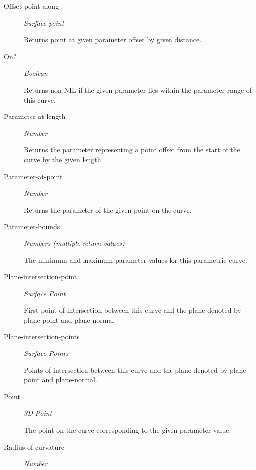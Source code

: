 \documentclass [11pt]{book}
\begin{document}
\begin{itemize}
\begin{description}
\item [Offset-point-along]
\emph{Surface point}

 Returns point at given parameter offset by given distance.




\item [On?]
\emph{Boolean}

 Returns non-NIL if the given parameter lies within the parameter range of this curve.




\item [Parameter-at-length]
\emph{Number}

 Returns the parameter representing a point offset from the start of the curve by the given length.




\item [Parameter-at-point]
\emph{Number}

 Returns the parameter of the given point on the curve.




\item [Parameter-bounds]
\emph{Numbers (multiple return values)}

 The minimum and maximum parameter values for this parametric curve.




\item [Plane-intersection-point]
\emph{Surface Point}

  First point of intersection between this curve and the plane denoted by plane-point and plane-normal




\item [Plane-intersection-points]
\emph{Surface Points}

  Points of intersection between this curve and the plane denoted by plane-point and plane-normal.




\item [Point]
\emph{3D Point}

 The point on the curve corresponding to the given parameter value.




\item [Radius-of-curvature]
\emph{Number}


\end{description}
\end{itemize}
\end{document}
